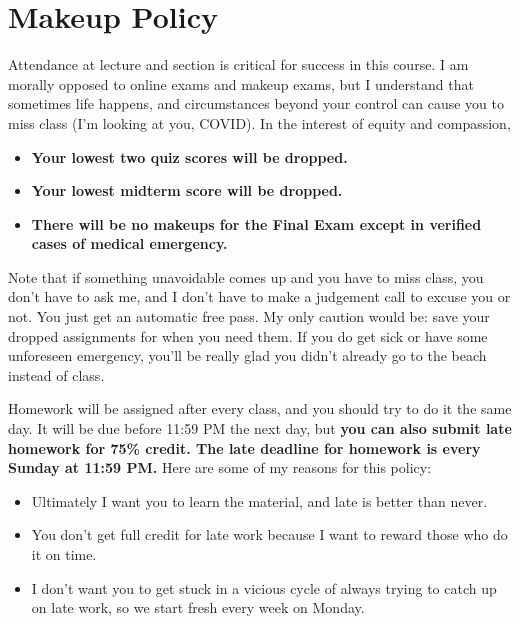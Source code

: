 \documentclass[11pt,letterpaper]{article}
\begin{document}
\section*{Makeup Policy}
Attendance at lecture and section is critical for success in this course. I am morally opposed to online exams and makeup exams, but I understand that sometimes life happens, and circumstances beyond your control can cause you to miss class (I’m looking at you, COVID). In the interest of equity and compassion, 
\begin{itemize}[nosep]
\item \textbf{Your lowest two quiz scores will be dropped.}
\item \textbf{Your lowest midterm score will be dropped.}
\item \textbf{There will be no makeups for the Final Exam except in verified cases of medical emergency.}
\end{itemize}
Note that if something unavoidable comes up and you have to miss class, you don’t have to ask me, and I don’t have to make a judgement call to excuse you or not. You just get an automatic free pass. My only caution would be: save your dropped assignments for when you need them. If you do get sick or have some unforeseen emergency, you’ll be really glad you didn’t already go to the beach instead of class. 

Homework will be assigned after every class, and you should try to do it the same day. It will be due before 11:59 PM the next day, but \textbf{you can also submit late homework for 75\% credit. The late deadline for homework is every Sunday at 11:59 PM.} Here are some of my reasons for this policy:
\begin{itemize}[nosep, label={--}]
\item Ultimately I want you to learn the material, and late is better than never. 
\item You don’t get full credit for late work because I want to reward those who do it on time. 
\item I don’t want you to get stuck in a vicious cycle of always trying to catch up on late work, so we start fresh every week on Monday. 
\end{itemize}

\pagebreak
\end{document}
